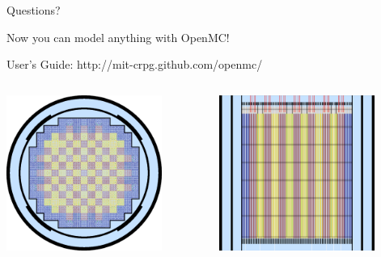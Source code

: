 \documentclass[serif]{beamer}
\begin{document}

\begin{frame}{Questions?}

      \centering
      
      Now you can model anything with OpenMC!
      
      \vspace{0.3cm}
      
      User's Guide: http://mit-crpg.github.com/openmc/
      
      \vspace{0.5cm}
      
      \begin{columns}
        \begin{column}{0.5\linewidth}
          \includegraphics[width=2in]{src/core.png}
        \end{column}
        \begin{column}{0.5\linewidth}
          \centering
          \includegraphics[width=2in]{src/axial.png}      
        \end{column}
      \end{columns}
      
\end{frame}

\end{document}
